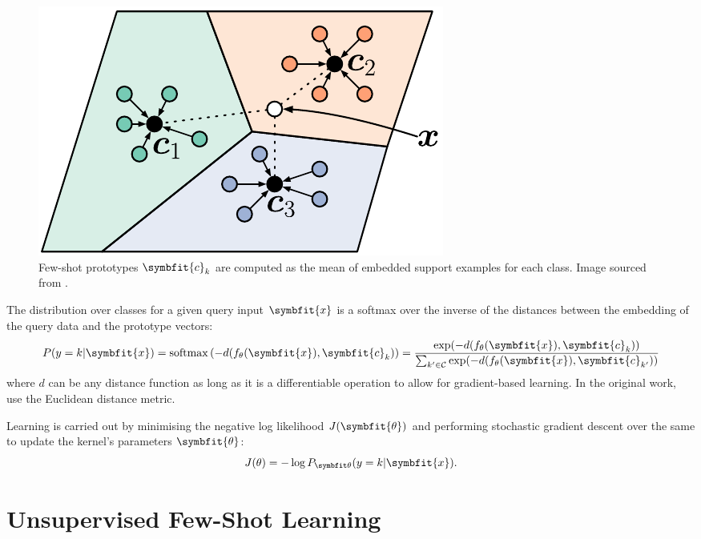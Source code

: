 \begin{figure}[ht]
    \centering
    \includegraphics[scale=0.85]{chapters/assets/fsl/prototype_fewshot_v3.pdf}
    \caption{Few-shot prototypes $\symbfit{c}_k$ are computed as the mean of embedded support examples for each class. Image sourced from \parencite{Snell2017PrototypicalLearning}.}
    \label{fig:protonets}
\end{figure}

The distribution over classes for a given query input $\symbfit{x}$ is a softmax over the inverse of the distances between the embedding of the query data and the prototype vectors:
\begin{equation}
    P(y=k\vert\symbfit{x})=\operatorname{softmax}\left(-d(f_\theta(\symbfit{x}), \symbfit{c}_k)\right) = \frac{\exp(-d(f_\theta(\symbfit{x}), \symbfit{c}_k))}{\sum_{k^\prime \in \mathcal{C}}\exp(-d(f_\theta(\symbfit{x}), \symbfit{c}_{k^\prime}))}
    \label{eqn:fsl-proto-classification}
\end{equation}
where $d$ can be any distance function as long as it is a differentiable operation to allow for gradient-based learning. In the original work, \textcite{Snell2017PrototypicalLearning} use the Euclidean distance metric.

Learning is carried out by minimising the negative log likelihood $J(\symbfit{\theta})$ and performing stochastic gradient descent over the same to update the kernel's parameters $\symbfit{\theta}$:
\begin{equation}
    J(\theta)=-\log P_{\symbfit \theta}(y=k \vert \symbfit{x}).
\end{equation}


\section{Unsupervised Few-Shot Learning}\label{sec:u-fsl}

